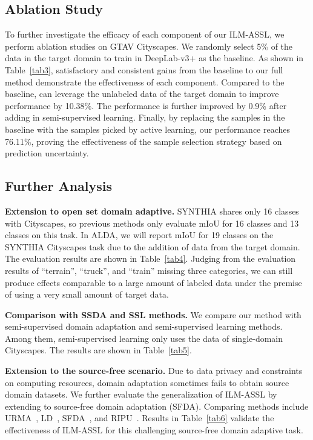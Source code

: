 \documentclass[journal]{IEEEtran}
\newcommand{\Tref}[1]{Table~\ref{#1}}
\renewcommand{\paragraph}[1]{\vspace{1.25mm}\noindent\textbf{#1}}
\newcommand{\method}{ILM-ASSL\xspace}
\newcommand{\ssl}{semi-supervised learning\xspace}
\begin{document}
\subsection{Ablation Study}
\label{sec:ablation}

To further investigate the efficacy of each component of our \method, we perform ablation studies on GTAV  Cityscapes. We randomly select 5\% of the data in the target domain to train in DeepLab-v3+ as the baseline. As shown in \Tref{tab3}, satisfactory and consistent gains from the baseline to our full method demonstrate the effectiveness of each component. Compared to the baseline,  can leverage the unlabeled data of the target domain to improve performance by 10.38\%. The performance is further improved by 0.9\% after adding  in \ssl. Finally, by replacing the samples in the baseline with the samples picked by active learning, our performance reaches 76.11\%, proving the effectiveness of the sample selection strategy based on prediction uncertainty.


\subsection{Further Analysis}
\label{sec:analysis_results}

\paragraph{Extension to open set domain adaptive.} SYNTHIA shares only 16 classes with Cityscapes, so previous methods only evaluate mIoU for 16 classes and 13 classes on this task. In ALDA, we will report mIoU for 19 classes on the SYNTHIA  Cityscapes task due to the addition of data from the target domain. The evaluation results are shown in \Tref{tab4}. Judging from the evaluation results of ``terrain'', ``truck'', and ``train'' missing three categories, we can still produce effects comparable to a large amount of labeled data under the premise of using a very small amount of target data.

\paragraph{Comparison with SSDA and SSL methods.} We compare our method with semi-supervised domain adaptation and semi-supervised learning methods. Among them, semi-supervised learning only uses the data of single-domain Cityscapes. The results are shown in \Tref{tab5}.

\paragraph{Extension to the source-free scenario.} Due to data privacy and constraints on computing resources, domain adaptation sometimes fails to obtain source domain datasets. We further evaluate the generalization of \method by extending to source-free domain adaptation (SFDA). Comparing methods include URMA~\cite{fleuret2021uncertainty}, LD~\cite{you2021domain}, SFDA~\cite{kundu2021generalize}, and RIPU~\cite{xie2022towards}. Results in \Tref{tab6} validate the effectiveness of \method for this challenging source-free domain adaptive task. 
\end{document}
